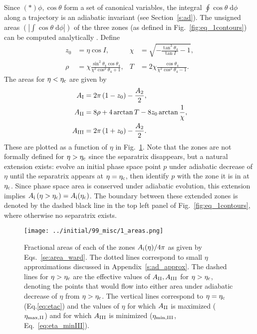 \documentclass[
        fleqn,
        usenatbib,
        referee,
    ]{mnras}
\newcommand*{\abs}[1]{\left|#1\right|}
\newcommand*{\p}[1]{\left(#1\right)}
\begin{document}
Since $\p*{\phi, \cos \theta}$ form a set of canonical variables, the integral
$\oint \cos \theta\;\mathrm{d}\phi$ along a trajectory is an adiabatic invariant
(see Section~\autoref{s:ad}). The unsigned areas $\p{\abs{\int \cos \theta
\;\mathrm{d}\phi}}$ of the three zones (as defined in
Fig.~\autoref{fig:eq_1contours}) can be computed analytically
\citep{henrard1987,ward2004I}. Define
\begin{subequations}
    \begin{align}
        z_0 &= \eta\cos I, &
        \chi &= \sqrt{-\frac{\tan^3\theta_4}{\tan I} - 1},\\
        \rho &= \chi \frac{\sin^2 \theta_4\cos \theta_4}{
            \chi^2 \cos^2\theta_4 + 1},&
        T &= 2\chi \frac{\cos \theta_4}{
            \chi^2 \cos^2\theta_4 - 1}.
    \end{align}
\end{subequations}
The areas for $\eta < \eta_{\rm c}$ are given by
\begin{subequations}\label{se:area_ward}
    \begin{align}
        A_{\rm I} &= 2\pi\p{1 - z_0} - \frac{A_2}{2},\\
        A_{\rm II} &= 8\rho + 4\arctan T - 8z_0 \arctan \frac{1}{\chi},\\
        A_{\rm III} &= 2\pi\p{1 + z_0} - \frac{A_2}{2}.
    \end{align}
\end{subequations}
These are plotted as a function of $\eta$ in Fig.~\ref{fig:eq_areas}. Note that
the zones are not formally defined for $\eta > \eta_{\rm c}$ since the
separatrix disappears, but a natural extension exists: evolve an initial phase
space point $p$ under adiabatic decrease of $\eta$ until the separatrix appears
at $\eta = \eta_{\rm c}$, then identify $p$ with the zone it is in at $\eta_{\rm
c}$. Since phase space area is conserved under adiabatic evolution, this
extension implies $A_{\rm i}\p{\eta > \eta_{\rm c}} = A_{\rm i}(\eta_{\rm c})$.
The boundary between these extended zones is denoted by the dashed black line in
the top left panel of Fig.~\ref{fig:eq_1contours}, where otherwise no separatrix
exists.
\begin{figure}
    \centering
    \texttt{[image: ../initial/99\_misc/1\_areas.png]}
    \caption{Fractional areas of each of the zones $A_{\rm i}(\eta) /
    4\pi$ as given by Eqs.~\eqref{se:area_ward}. The dotted lines correspond to
    small $\eta$ approximations discussed in Appendix~\ref{s:ad_approx}. The
    dashed lines for $\eta > \eta_{\rm c}$ are the effective values of $A_{\rm
    II}, A_{\rm III}$ for $\eta > \eta_{\rm c}$, denoting the points that would
    flow into either area under adiabatic decrease of $\eta$ from $\eta >
    \eta_{\rm c}$. The vertical lines correspond to $\eta = \eta_{\rm c}$
    (Eq.\eqref{eq:etac}) and the values of $\eta$ for which $A_{\rm II}$ is
    maximized ($\eta_{\rm \max, II}$) and for which $A_{\rm III}$ is minimized
    ($\eta_{\rm \min, III}$, Eq.~\eqref{eq:eta_minIII}).}\label{fig:eq_areas}
\end{figure}
\end{document}

